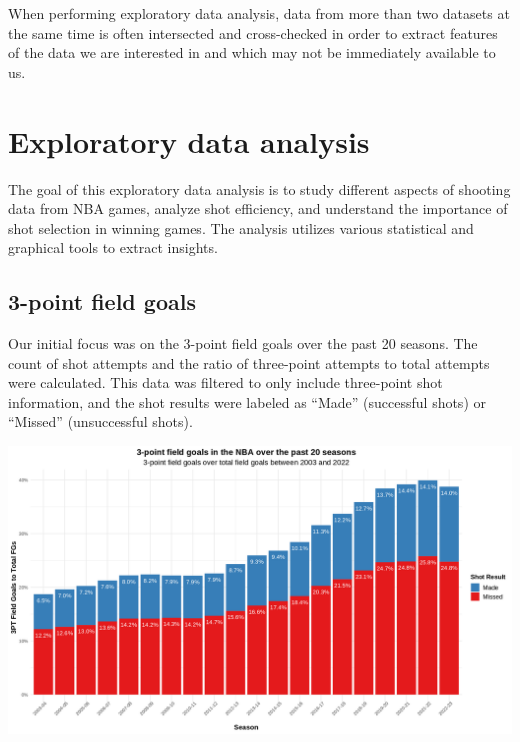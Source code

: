 \documentclass[
  12pt,
  a4paper,
]{article}
\let\origfigure\figure
\let\endorigfigure\endfigure
\renewenvironment{figure}[1][2] {
    \expandafter\origfigure\expandafter[H]
} {
    \endorigfigure
}
\begin{document}
When performing exploratory data analysis, data from more than two datasets at the same time is often intersected and cross-checked in order to extract features of the data we are interested in and which may not be immediately available to us.

\hypertarget{exploratory-data-analysis}{%
\section{Exploratory data analysis}\label{exploratory-data-analysis}}

The goal of this exploratory data analysis is to study different aspects of shooting data from NBA games, analyze shot efficiency, and understand the importance of shot selection in winning games. The analysis utilizes various statistical and graphical tools to extract insights.

\hypertarget{point-field-goals}{%
\subsection{3-point field goals}\label{point-field-goals}}

Our initial focus was on the 3-point field goals over the past 20 seasons. The count of shot attempts and the ratio of three-point attempts to total attempts were calculated. This data was filtered to only include three-point shot information, and the shot results were labeled as ``Made'' (successful shots) or ``Missed'' (unsuccessful shots).

\begin{figure}

{\centering \includegraphics[width=1\linewidth]{latex/plotspng/plot_1} 

}

\caption{3-point field goals over total field goals between 2003 and 2022}\label{fig:3ptprog}
\end{figure}
\end{document}
